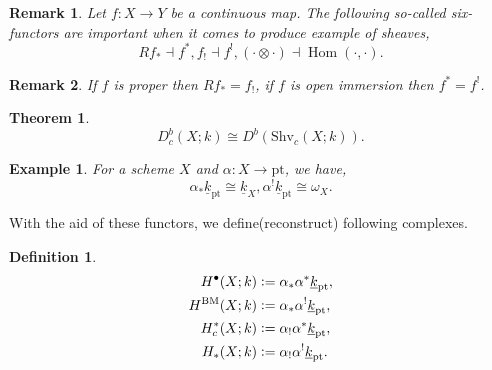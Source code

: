 \documentclass[8pt]{article}
\numberwithin{equation}{section}
\newtheorem{theorem}{Theorem} [section]
\newtheorem{definition}{Definition}[section]
\newtheorem{remark}{Remark}[section]
\newtheorem{example}{Example}[section]
\DeclareMathOperator{\Hom}{Hom}
\newcommand{\defeq}{\vcentcolon=}
\newcommand{\ul}[1]{\underline{#1}}
\newcommand{\Shv}[0]{\mathrm{Shv}}
\newcommand{\pt}[0]{\mathrm{pt}}
\begin{document}
\begin{remark}
    Let $f:X\to Y$ be a continuous map. The following so-called six-functors are important when it comes to produce example of sheaves,
    \begin{equation*}
        Rf_*\dashv f^*, f_!\dashv f^!, (\cdot\otimes\cdot)\dashv \Hom(\cdot,\cdot).
    \end{equation*}
\end{remark}


\begin{remark}
    \label{remark_1_6}
    If $f$ is proper then $Rf_* = f_!$, if $f$ is open immersion then $f^* = f^!$.
\end{remark}


\begin{theorem}
    \begin{equation*}
        D_c^b(X;k)\cong D^b(\Shv_c(X;k)).
    \end{equation*}
\end{theorem}

\begin{example}
    For a scheme $X$ and $\alpha:X\to\mathrm{pt}$, we have,
    \begin{equation*}
        \alpha_*\ul{k}_{\mathrm{pt}} \cong \ul{k}_X,\alpha^!\ul{k}_{\mathrm{pt}}\cong \omega_X.
    \end{equation*}
\end{example}

With the aid of these functors, we define(reconstruct) following complexes.
\begin{definition}
    \begin{align*}
        H^\bullet(X;k) &\defeq \alpha_*\alpha^*\ul{k}_\pt,\\
        H^{\mathrm{BM}}(X;k) &\defeq\alpha_*\alpha^!\ul{k}_\pt,\\
        H^*_c(X;k)&\defeq \alpha_!\alpha^*\ul{k}_\pt,\\
        H_*(X;k)&\defeq \alpha_!\alpha^!\ul{k}_\pt.
    \end{align*}
\end{definition}
\end{document}

